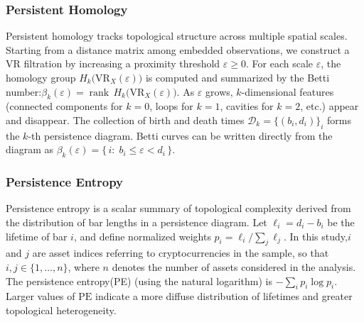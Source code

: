 \documentclass[11pt,reqno]{amsart}
\numberwithin{equation}{section} %
\begin{document}
\subsubsection{Persistent Homology}

Persistent homology tracks topological structure across multiple spatial scales\citep{RN2718}. Starting from a distance matrix among embedded observations, we construct a VR filtration by increasing a proximity threshold \(\varepsilon \ge 0\). For each scale \(\varepsilon\), the homology group \(H_k\big(\mathrm{VR}_X(\varepsilon)\big)\) is computed and summarized by the Betti number:\(
\beta_k(\varepsilon)=\operatorname{rank}\, H_k\big(\mathrm{VR}_X(\varepsilon)\big)\).
As \(\varepsilon\) grows, \(k\)-dimensional features (connected components for \(k=0\), loops for \(k=1\), cavities for \(k=2\), etc.) appear and disappear. The collection of birth and death times \(\mathcal{D}_k=\{(b_i,d_i)\}_i\) forms the \(k\)-th persistence diagram. Betti curves can be written directly from the diagram as
\(
\beta_k(\varepsilon)=\{\, i:\; b_i \le \varepsilon < d_i \,\}\)\citep{RN3239}.

\subsubsection{Persistence Entropy}

Persistence entropy is a scalar summary of topological complexity derived from the distribution of bar lengths in a persistence diagram\citep{RN3930}. Let \(\ell_i=d_i-b_i\) be the lifetime of bar \(i\), and define normalized weights $p_i = \ell_i \Big/ \sum_{j} \ell_{j}$.
In this study,\(i\) and \(j\) are asset indices referring to cryptocurrencies in the sample, so that \(i,j \in \{1,\dots,n\}\), where \(n\) denotes the number of assets considered in the analysis.
The persistence entropy(PE) (using the natural logarithm) is \(-\sum_i p_i \log p_i . \label{eq:persistence-entropy}\)
Larger values of \(\mathrm{PE}\) indicate a more diffuse distribution of lifetimes and greater topological heterogeneity.
\end{document}
